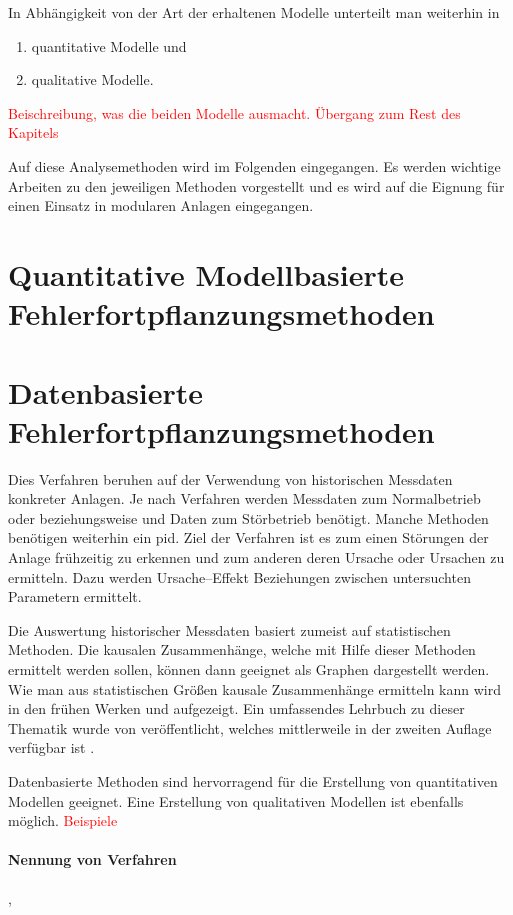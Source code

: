 In Abh\"angigkeit von der Art der erhaltenen Modelle unterteilt man weiterhin in \begin{enumerate}
\item quantitative Modelle und
\item qualitative Modelle. 
\end{enumerate}\cite{Zhang_2017}

\textcolor{red}{Beischreibung, was die beiden Modelle ausmacht.}
\textcolor{red}{\"Ubergang zum Rest des Kapitels}

Auf diese Analysemethoden wird im Folgenden eingegangen. Es werden wichtige Arbeiten zu den jeweiligen Methoden vorgestellt und es wird auf die Eignung f\"ur einen Einsatz in modularen Anlagen eingegangen.

\section{Quantitative Modellbasierte Fehlerfortpflanzungsmethoden}
\section{Datenbasierte Fehlerfortpflanzungsmethoden}
Dies Verfahren beruhen auf der Verwendung von historischen Messdaten konkreter Anlagen. Je nach Verfahren werden Messdaten zum Normalbetrieb oder beziehungsweise und Daten zum St\"orbetrieb ben\"otigt. Manche Methoden ben\"otigen weiterhin ein \ac{pid}. Ziel der Verfahren ist es zum einen St\"orungen der Anlage fr\"uhzeitig zu erkennen und zum anderen deren Ursache oder Ursachen zu ermitteln. Dazu werden Ursache--Effekt Beziehungen zwischen untersuchten Parametern ermittelt.  

Die Auswertung historischer Messdaten basiert zumeist auf statistischen Methoden. Die kausalen Zusammenh\"ange, welche mit Hilfe dieser Methoden ermittelt werden sollen, k\"onnen dann geeignet als Graphen dargestellt werden. Wie man aus statistischen Gr\"o\ss{}en kausale Zusammenh\"ange ermitteln kann wird in den fr\"uhen Werken \textcite{Holland_1986} und  \textcite{Pearl_1995} aufgezeigt. Ein umfassendes Lehrbuch zu dieser Thematik wurde von \citeauthor{Pearl_2009} ver\"offentlicht, welches mittlerweile in der zweiten Auflage verf\"ugbar ist \cite{Pearl_2009}.

Datenbasierte Methoden sind hervorragend f\"ur die Erstellung von quantitativen Modellen geeignet. Eine Erstellung von qualitativen Modellen ist ebenfalls m\"oglich. \textcolor{red}{Beispiele}
\paragraph*{Nennung von Verfahren}
\cite{Zhang_2017}, \cite{Thornhill_2006}
